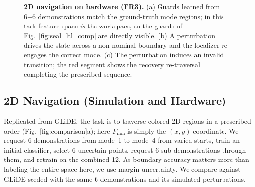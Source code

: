 \begin{figure}[t]
\centering

\caption{\textbf{2D navigation on hardware (FR3).} (a) Guards learned from 6+6 demonstrations match the ground-truth mode regions; in this task feature space \emph{is} the workspace, so the guards of Fig.~\ref{fig:seal_ltl_comp} are directly visible. (b) A perturbation drives the state across a non-nominal boundary and the localizer re-engages the correct mode. (c) The perturbation induces an invalid transition; the red segment shows the recovery re-traversal completing the prescribed sequence.}
\label{fig:2d_recovery}
\end{figure}

\subsection{2D Navigation (Simulation and Hardware)}
\label{sec:2d_nav}
Replicated from GLiDE, the task is to traverse colored 2D regions in a prescribed order (Fig.~\ref{fig:comparison}a); here $F_{\min}$ is simply the $(x,y)$ coordinate. We request 6 demonstrations from mode~1 to mode~4 from varied starts, train an initial classifier, select 6 uncertain points, request 6 sub-demonstrations through them, and retrain on the combined 12. As boundary accuracy matters more than labeling the entire space here, we use margin uncertainty. We compare against GLiDE seeded with the same 6 demonstrations and its simulated perturbations.

